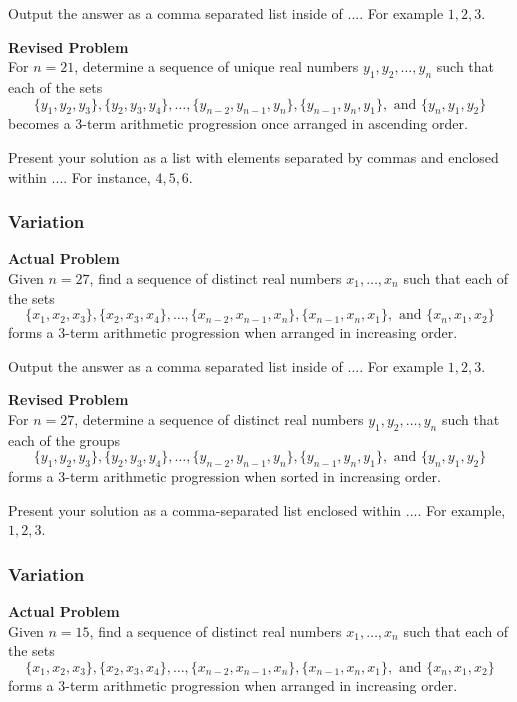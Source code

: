 Output the answer as a comma separated list inside of $\boxed{...}$. For example $\boxed{1, 2, 3}$.

\textbf{Revised Problem}\\
For $n = 21$, determine a sequence of unique real numbers $y_1, y_2, \ldots, y_n$ such that each of the sets $$\{y_1, y_2, y_3\}, \{y_2, y_3, y_4\},\ldots,\{y_{n-2}, y_{n-1}, y_n\}, \{y_{n-1}, y_n, y_1\}, \text{ and } \{y_n, y_1, y_2\}$$ becomes a 3-term arithmetic progression once arranged in ascending order.

Present your solution as a list with elements separated by commas and enclosed within $\boxed{...}$. For instance, $\boxed{4, 5, 6}$.

\subsubsection{Variation}
\textbf{Actual Problem}\\
Given $n = 27$, find a sequence of distinct real numbers $x_1, \ldots, x_n$ such that each of the sets$$\{x_1, x_2, x_3\}, \{x_2, x_3, x_4\},\ldots,\{x_{n-2}, x_{n-1}, x_n\}, \{x_{n-1}, x_n, x_1\},\text{ and } \{x_n, x_1, x_2\}$$ forms a 3-term arithmetic progression when arranged in increasing order.

Output the answer as a comma separated list inside of $\boxed{...}$. For example $\boxed{1, 2, 3}$.

\textbf{Revised Problem}\\
For $n = 27$, determine a sequence of distinct real numbers $y_1, y_2, \ldots, y_n$ such that each of the groups $$\{y_1, y_2, y_3\}, \{y_2, y_3, y_4\}, \ldots, \{y_{n-2}, y_{n-1}, y_n\}, \{y_{n-1}, y_n, y_1\},\text{ and } \{y_n, y_1, y_2\}$$ forms a 3-term arithmetic progression when sorted in increasing order.

Present your solution as a comma-separated list enclosed within $\boxed{...}$. For example, $\boxed{1, 2, 3}$.

\subsubsection{Variation}
\textbf{Actual Problem}\\
Given $n = 15$, find a sequence of distinct real numbers $x_1, \ldots, x_n$ such that each of the sets$$\{x_1, x_2, x_3\}, \{x_2, x_3, x_4\},\ldots,\{x_{n-2}, x_{n-1}, x_n\}, \{x_{n-1}, x_n, x_1\},\text{ and } \{x_n, x_1, x_2\}$$ forms a 3-term arithmetic progression when arranged in increasing order.

